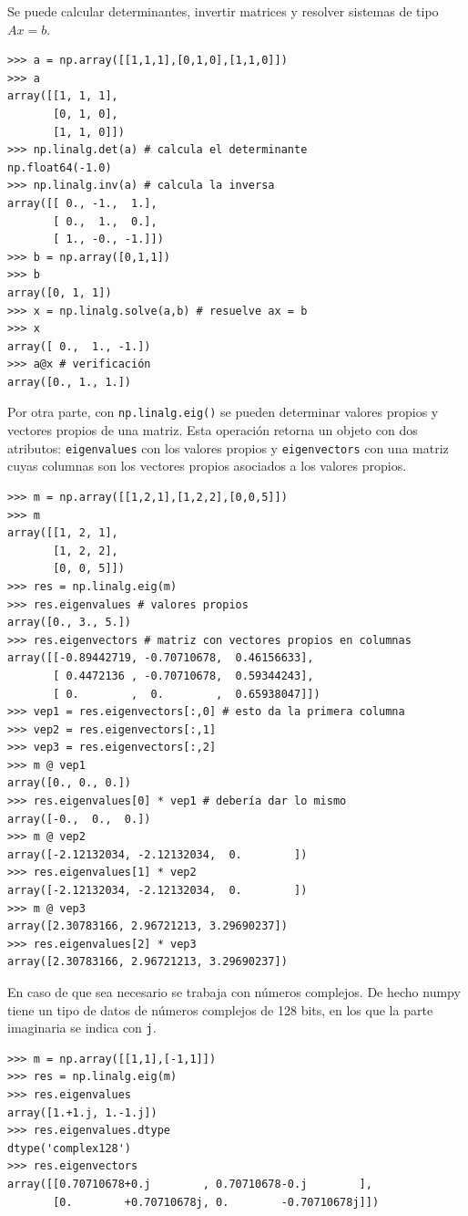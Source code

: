 \documentclass[a4paper, 12pt]{report}
\theoremstyle{definition}
\begin{document}
Se puede calcular determinantes, invertir matrices y resolver sistemas de tipo $Ax=b$.
\begin{verbatim}
>>> a = np.array([[1,1,1],[0,1,0],[1,1,0]])
>>> a
array([[1, 1, 1],
       [0, 1, 0],
       [1, 1, 0]])
>>> np.linalg.det(a) # calcula el determinante
np.float64(-1.0)
>>> np.linalg.inv(a) # calcula la inversa
array([[ 0., -1.,  1.],
       [ 0.,  1.,  0.],
       [ 1., -0., -1.]])
>>> b = np.array([0,1,1])
>>> b
array([0, 1, 1])
>>> x = np.linalg.solve(a,b) # resuelve ax = b
>>> x
array([ 0.,  1., -1.])
>>> a@x # verificación
array([0., 1., 1.])
\end{verbatim}
Por otra parte, con {\tt np.linalg.eig()} se pueden determinar valores propios y vectores propios de una matriz. Esta operación retorna un objeto con dos atributos: {\tt eigenvalues} con los valores propios y {\tt eigenvectors} con una matriz cuyas columnas son los vectores propios asociados a los valores propios.
\begin{verbatim}
>>> m = np.array([[1,2,1],[1,2,2],[0,0,5]])
>>> m
array([[1, 2, 1],
       [1, 2, 2],
       [0, 0, 5]])
>>> res = np.linalg.eig(m)
>>> res.eigenvalues # valores propios
array([0., 3., 5.])
>>> res.eigenvectors # matriz con vectores propios en columnas
array([[-0.89442719, -0.70710678,  0.46156633],
       [ 0.4472136 , -0.70710678,  0.59344243],
       [ 0.        ,  0.        ,  0.65938047]])
>>> vep1 = res.eigenvectors[:,0] # esto da la primera columna
>>> vep2 = res.eigenvectors[:,1]
>>> vep3 = res.eigenvectors[:,2]
>>> m @ vep1
array([0., 0., 0.])
>>> res.eigenvalues[0] * vep1 # debería dar lo mismo
array([-0.,  0.,  0.])
>>> m @ vep2
array([-2.12132034, -2.12132034,  0.        ])
>>> res.eigenvalues[1] * vep2
array([-2.12132034, -2.12132034,  0.        ])
>>> m @ vep3
array([2.30783166, 2.96721213, 3.29690237])
>>> res.eigenvalues[2] * vep3
array([2.30783166, 2.96721213, 3.29690237])
\end{verbatim}
En caso de que sea necesario se trabaja con números complejos. De hecho numpy tiene un tipo de datos de números complejos de 128 bits, en los que la parte imaginaria se indica con {\tt j}.
\begin{verbatim}
>>> m = np.array([[1,1],[-1,1]])
>>> res = np.linalg.eig(m)
>>> res.eigenvalues
array([1.+1.j, 1.-1.j])
>>> res.eigenvalues.dtype
dtype('complex128')
>>> res.eigenvectors
array([[0.70710678+0.j        , 0.70710678-0.j        ],
       [0.        +0.70710678j, 0.        -0.70710678j]])
\end{verbatim}
\end{document}

